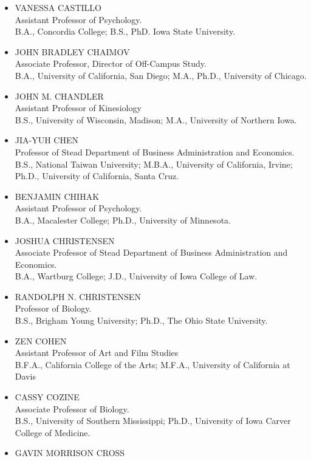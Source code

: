\documentclass[
  letterpaper,
]{scrbook}
\begin{document}
\begin{itemize}
\item
  VANESSA CASTILLO\\
  Assistant Professor of Psychology.\\
  B.A., Concordia College; B.S., PhD. Iowa State University.
\item
  JOHN BRADLEY CHAIMOV\\
  Associate Professor, Director of Off-Campus Study.\\
  B.A., University of California, San Diego; M.A., Ph.D., University of
  Chicago.
\item
  JOHN M. CHANDLER\\
  Assistant Professor of Kinesiology\\
  B.S., University of Wisconsin, Madison; M.A., University of Northern
  Iowa.
\item
  JIA-YUH CHEN\\
  Professor of Stead Department of Business Administration and
  Economics.\\
  B.S., National Taiwan University; M.B.A., University of California,
  Irvine; Ph.D., University of California, Santa Cruz.
\item
  BENJAMIN CHIHAK\\
  Assistant Professor of Psychology.\\
  B.A., Macalester College; Ph.D., University of Minnesota.
\item
  JOSHUA CHRISTENSEN\\
  Associate Professor of Stead Department of Business Administration and
  Economics.\\
  B.A., Wartburg College; J.D., University of Iowa College of Law.
\item
  RANDOLPH N. CHRISTENSEN\\
  Professor of Biology.\\
  B.S., Brigham Young University; Ph.D., The Ohio State University.
\item
  ZEN COHEN\\
  Assistant Professor of Art and Film Studies\\
  B.F.A., California College of the Arts; M.F.A., University of
  California at Davis
\item
  CASSY COZINE\\
  Associate Professor of Biology.\\
  B.S., University of Southern Mississippi; Ph.D., University of Iowa
  Carver College of Medicine.
\item
  GAVIN MORRISON CROSS\\

\end{itemize}
\end{document}

